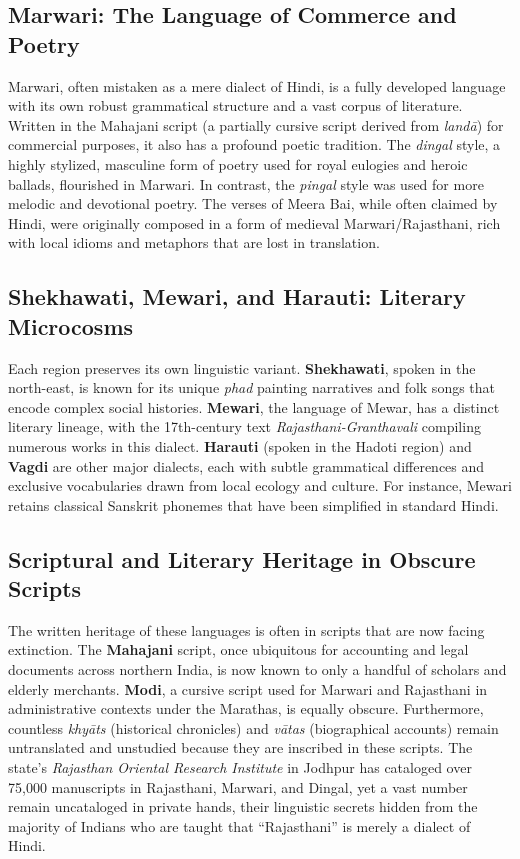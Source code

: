 \documentclass[12pt]{article}
\begin{document}
\subsection{Marwari: The Language of Commerce and Poetry}
Marwari, often mistaken as a mere dialect of Hindi, is a fully developed language with its own robust grammatical structure and a vast corpus of literature. Written in the Mahajani script (a partially cursive script derived from \textit{landā}) for commercial purposes, it also has a profound poetic tradition. The \textit{dingal} style, a highly stylized, masculine form of poetry used for royal eulogies and heroic ballads, flourished in Marwari. In contrast, the \textit{pingal} style was used for more melodic and devotional poetry. The verses of Meera Bai, while often claimed by Hindi, were originally composed in a form of medieval Marwari/Rajasthani, rich with local idioms and metaphors that are lost in translation.

\subsection{Shekhawati, Mewari, and Harauti: Literary Microcosms}
Each region preserves its own linguistic variant. \textbf{Shekhawati}, spoken in the north-east, is known for its unique \textit{phad} painting narratives and folk songs that encode complex social histories. \textbf{Mewari}, the language of Mewar, has a distinct literary lineage, with the 17th-century text \textit{Rajasthani-Granthavali} compiling numerous works in this dialect. \textbf{Harauti} (spoken in the Hadoti region) and \textbf{Vagdi} are other major dialects, each with subtle grammatical differences and exclusive vocabularies drawn from local ecology and culture. For instance, Mewari retains classical Sanskrit phonemes that have been simplified in standard Hindi.

\subsection{Scriptural and Literary Heritage in Obscure Scripts}
The written heritage of these languages is often in scripts that are now facing extinction. The \textbf{Mahajani} script, once ubiquitous for accounting and legal documents across northern India, is now known to only a handful of scholars and elderly merchants. \textbf{Modi}, a cursive script used for Marwari and Rajasthani in administrative contexts under the Marathas, is equally obscure. Furthermore, countless \textit{khyāts} (historical chronicles) and \textit{vātas} (biographical accounts) remain untranslated and unstudied because they are inscribed in these scripts. The state’s \textit{Rajasthan Oriental Research Institute} in Jodhpur has cataloged over 75,000 manuscripts in Rajasthani, Marwari, and Dingal, yet a vast number remain uncataloged in private hands, their linguistic secrets hidden from the majority of Indians who are taught that “Rajasthani” is merely a dialect of Hindi.
\end{document}
